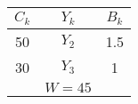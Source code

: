 \begin{tabular}{ccc}
\hline
\hline
$C_k$  & $Y_k$  & $B_k$ \bigstrut\\
\hline
50     & $Y_2$  & 1.5 \bigstrut[t]\\
30     & $Y_3$  & 1 \bigstrut[b]\\
\hline
       & $W=45$ &  \bigstrut\\
\hline
\hline
\end{tabular}%
